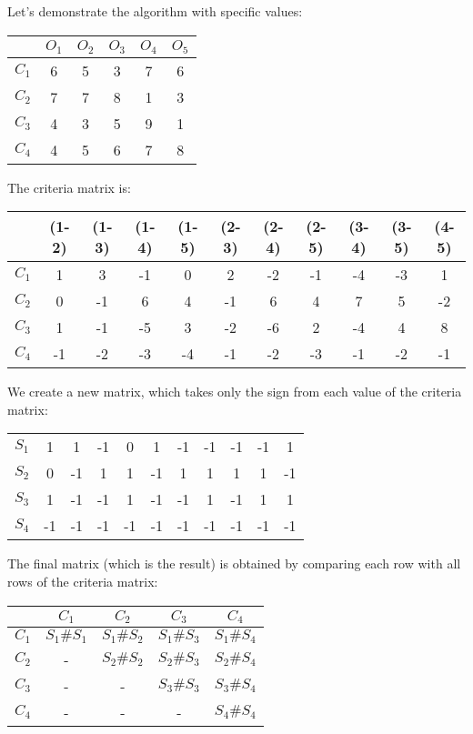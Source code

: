 \documentclass{beamer}
\begin{document}
\begin{frame}
Let's demonstrate the algorithm with specific values:
\begin{center}
\begin{tabular}{c|ccccc}
& $O_1$ & $O_2$ & $O_3$ & $O_4$ & $O_5$ \\
\hline $C_1$ & 6 & 5 & 3 & 7 & 6 \\
$C_2$ & 7 & 7 & 8 & 1 & 3 \\
$C_3$ & 4 & 3 & 5 & 9 & 1 \\
$C_4$ & 4 & 5 & 6 & 7 & 8 \\
\end{tabular}
\end{center}

The criteria matrix is:
\begin{center}
\begin{tabular}{c|cccccccccc}
& {\tiny (1-2)} & {\tiny (1-3)} & {\tiny (1-4)} & {\tiny (1-5)} &
{\tiny (2-3)} & {\tiny (2-4)} & {\tiny (2-5)} & {\tiny (3-4)} & {\tiny (3-5)} & {\tiny (4-5)} \\
\hline $C_1$ & 1 & 3 & -1 & 0 & 2 & -2 & -1 & -4 & -3 & 1 \\
$C_2$ & 0 & -1 & 6 & 4 & -1 & 6 & 4 & 7 & 5 & -2 \\
$C_3$ & 1 & -1 & -5 & 3 & -2 & -6 & 2 & -4 & 4 & 8 \\
$C_4$ & -1 & -2 & -3 & -4 & -1 & -2 & -3 & -1 & -2 & -1
\end{tabular}
\end{center}
\end{frame}


\begin{frame}
We create a new matrix, which takes only the sign from each value of the criteria matrix:
\begin{center}
\begin{tabular}{c|cccccccccc}
& & & & & & & & & & \\
\hline $S_1$ & 1 & 1 & -1 & 0 & 1 & -1 & -1 & -1 & -1 & 1 \\
$S_2$ & 0 & -1 & 1 & 1 & -1 & 1 & 1 & 1 & 1 & -1 \\
$S_3$ & 1 & -1 & -1 & 1 & -1 & -1 & 1 & -1 & 1 & 1 \\
$S_4$ & -1 & -1 & -1 & -1 & -1 & -1 & -1 & -1 & -1 & -1
\end{tabular}
\end{center}

The final matrix (which is the result) is obtained by comparing each row with all rows of the criteria matrix:
\begin{center}
\begin{tabular}{c|cccc}
& $C_1$ & $C_2$ & $C_3$ & $C_4$ \\
\hline $C_1$ & $S_1\#S_1$ & $S_1\#S_2$ & $S_1\#S_3$ & $S_1\#S_4$ \\
$C_2$ & - & $S_2\#S_2$ & $S_2\#S_3$ & $S_2\#S_4$ \\
$C_3$ & - & - & $S_3\#S_3$ & $S_3\#S_4$ \\
$C_4$ & - & - & - & $S_4\#S_4$
\end{tabular}
\end{center}
\end{frame}
\end{document}
